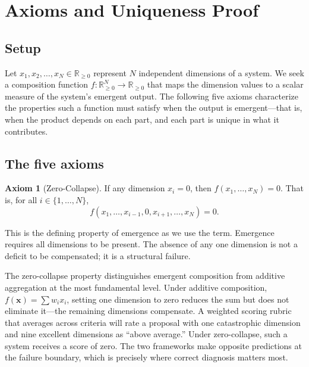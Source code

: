 \documentclass[12pt, a4paper]{article}
\theoremstyle{definition}
\newtheorem{axiom}{Axiom}
\theoremstyle{remark}
\newcommand{\Rnn}{\mathbb{R}_{\geq 0}}
\begin{document}
\section{Axioms and Uniqueness Proof}\label{sec:axioms}

\subsection{Setup}

Let $x_1, x_2, \ldots, x_N \in \Rnn$ represent $N$ independent dimensions of a system. We seek a composition function $f: \Rnn^N \to \Rnn$ that maps the dimension values to a scalar measure of the system's emergent output. The following five axioms characterize the properties such a function must satisfy when the output is emergent---that is, when the product depends on each part, and each part is unique in what it contributes.

\subsection{The five axioms}

\begin{axiom}[Zero-Collapse]\label{ax:zero}
If any dimension $x_i = 0$, then $f(x_1, \ldots, x_N) = 0$. That is, for all $i \in \{1, \ldots, N\}$,
\[
f(x_1, \ldots, x_{i-1}, 0, x_{i+1}, \ldots, x_N) = 0.
\]
\end{axiom}

\noindent This is the defining property of emergence as we use the term. Emergence requires all dimensions to be present. The absence of any one dimension is not a deficit to be compensated; it is a structural failure.

The zero-collapse property distinguishes emergent composition from additive aggregation at the most fundamental level. Under additive composition, $f(\mathbf{x}) = \sum w_i x_i$, setting one dimension to zero reduces the sum but does not eliminate it---the remaining dimensions compensate. A weighted scoring rubric that averages across criteria will rate a proposal with one catastrophic dimension and nine excellent dimensions as ``above average.'' Under zero-collapse, such a system receives a score of zero. The two frameworks make opposite predictions at the failure boundary, which is precisely where correct diagnosis matters most.
\end{document}
